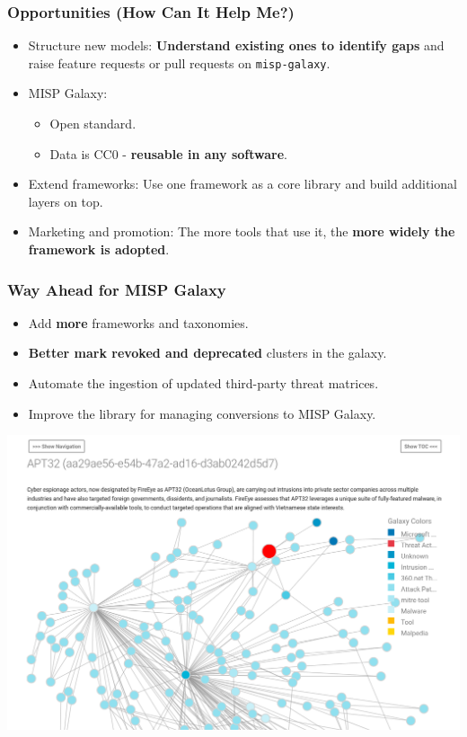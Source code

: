 \begin{frame}
        \frametitle{Opportunities (How Can It Help Me?)}
        \begin{itemize}
		\item Structure new models: {\bf Understand existing ones to identify gaps} and raise feature requests or pull requests on \texttt{misp-galaxy}.
            \item MISP Galaxy:
                \begin{itemize}
                    \item Open standard.
		    \item Data is CC0 - {\bf reusable in any software}.
                \end{itemize}
            \item Extend frameworks: Use one framework as a core library and build additional layers on top.
	    \item Marketing and promotion: The more tools that use it, the {\bf more widely the framework is adopted}.
        \end{itemize}
\end{frame}

\begin{frame}
        \frametitle{Way Ahead for MISP Galaxy}
        \begin{itemize}
            \item Add {\bf more} frameworks and taxonomies.
            \item {\bf Better mark revoked and deprecated} clusters in the galaxy.
            \item Automate the ingestion of updated third-party threat matrices.
            \item Improve the library for managing conversions to MISP Galaxy.
        \end{itemize}
	\begin{center}
	 	\includegraphics[scale=0.2]{./screenshots/misp-galaxy-website.png}
	\end{center}
\end{frame}

